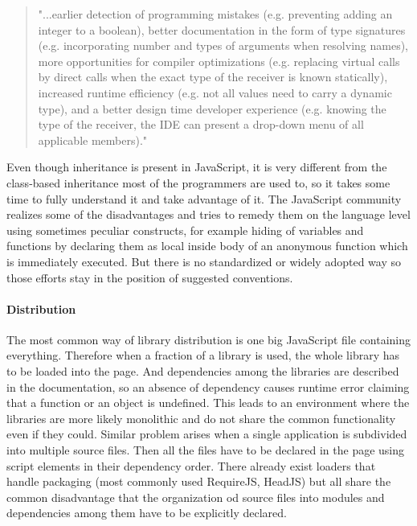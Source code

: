 \documentclass[12pt,a4paper]{report}
\begin{document}
\begin{quote}
"...earlier detection of programming mistakes (e.g. preventing adding an integer to a boolean), better documentation in the form of type signatures (e.g. incorporating number and types of arguments when resolving names), more opportunities for compiler optimizations (e.g. replacing virtual calls by direct calls when the exact type of the receiver is known statically), increased runtime efficiency (e.g. not all values need to carry a dynamic type), and a better design time developer experience (e.g. knowing the type of the receiver, the IDE can present a drop-down menu of all applicable members)."
\end{quote}

Even though inheritance is present in JavaScript, it is very different from the class-based inheritance most of the programmers are used to, so it takes some time to fully understand it and take advantage of it. The JavaScript community realizes some of the disadvantages and tries to remedy them on the language level using sometimes peculiar constructs, for example hiding of variables and functions by declaring them as local inside body of an anonymous function which is immediately executed. But there is no standardized or widely adopted way so those efforts stay in the position of suggested conventions.

\paragraph{Distribution} The most common way of library distribution is one big JavaScript file containing everything. Therefore when a fraction of a library is used, the whole library has to be loaded into the page. And dependencies among the libraries are described in the documentation, so an absence of dependency causes runtime error claiming that a function or an object is undefined. This leads to an environment where the libraries are more likely monolithic and do not share the common functionality even if they could. Similar problem arises when a single application is subdivided into multiple source files. Then all the files have to be declared in the page using script elements in their dependency order. There already exist loaders that handle packaging (most commonly used RequireJS\cite{RequireJs}, HeadJS\cite{HeadJs}) but all share the common disadvantage that the organization od source files into modules and dependencies among them have to be explicitly declared.
\end{document}
